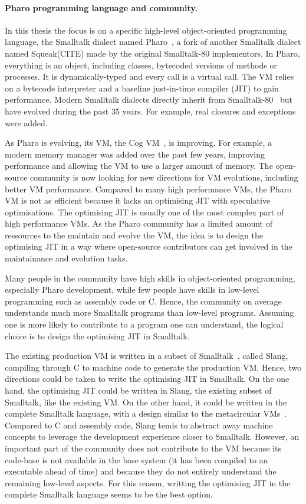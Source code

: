 \documentclass[a4paper,12pt,twoside]{../includes/ThesisStyle}
\begin{document}
\paragraph{Pharo programming language and community.}

In this thesis the focus is on a specific high-level object-oriented programming language, the Smalltalk dialect named Pharo~\cite{Blac09a}, a fork of another Smalltalk dialect named Squeak(CITE) made by the original Smalltalk-80 implementors. In Pharo, everything is an object, including classes, bytecoded versions of methods or processes. It is dynamically-typed and every call is a virtual call. The VM relies on a bytecode interpreter and a baseline just-in-time compiler (JIT) to gain performance. Modern Smalltalk dialects directly inherit from Smalltalk-80~\cite{Gold83a} but have evolved during the past 35 years. For example, real closures and exceptions were added.

As Pharo is evolving, its VM, the Cog VM~\cite{Mira08a}, is improving. For example, a modern memory manager was added over the past few years, improving performance and allowing the VM to use a larger amount of memory. The open-source community is now looking for new directions for VM evolutions, including better VM performance. Compared to many high performance VMs, the Pharo VM is not as efficient because it lacks an optimising JIT with speculative optimisations. The optimising JIT is usually one of the most complex part of high performance VMs. As the Pharo community has a limited amount of ressources to the maintain and evolve the VM, the idea is to design the optimising JIT in a way where open-source contributors can get involved in the maintainance and evolution tasks.

Many people in the community have high skills in object-oriented programming, especially Pharo development, while few people have skills in low-level programming such as assembly code or C. Hence, the community on average understands much more Smalltalk programs than low-level programs. Assuming one is more likely to contribute to a program one can understand, the logical choice is to design the optimising JIT in Smalltalk.

The existing production VM is written in a subset of Smalltalk~\cite{Inga97a}, called Slang, compiling through C to machine code to generate the production VM. Hence, two directions could be taken to write the optimising JIT in Smalltalk. On the one hand, the optimising JIT could be written in Slang, the existing subset of Smalltalk, like the existing VM. On the other hand, it could be written in the complete Smalltalk language, with a design similar to the metacircular VMs~\cite{Unga05b,Wimm13a,Alp99a}. Compared to C and assembly code, Slang tends to abstract away machine concepts to leverage the development experience closer to Smalltalk. However, an important part of the community does not contribute to the VM because its code-base is not available in the base system (it has been compiled to an executable ahead of time) and because they do not entirely understand the remaining low-level aspects. For this reason, writting the optimising JIT in the complete Smalltalk language seems to be the best option.
\end{document}
